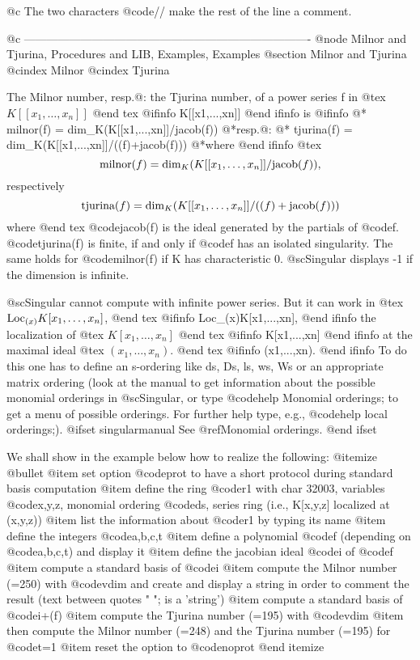 @c The two characters @code{//} make the rest of the line a comment.

@c ----------------------------------------------------------------------------
@node Milnor and Tjurina, Procedures and LIB, Examples, Examples
@section Milnor and Tjurina
@cindex Milnor
@cindex Tjurina

The Milnor number, resp.@: the Tjurina number, of a power
series f in
@tex
$K[[x_1,\ldots,x_n]]$
@end tex
@ifinfo
K[[x1,...,xn]]
@end ifinfo
is
@ifinfo
@*      milnor(f) = dim_K(K[[x1,...,xn]]/jacob(f))
@*resp.@:
@*      tjurina(f) = dim_K(K[[x1,...,xn]]/((f)+jacob(f)))
@*where
@end ifinfo
@tex
$$
\hbox{milnor}(f) = \hbox{dim}_K(K[[x_1,\ldots,x_n]]/\hbox{jacob}(f)),
$$
respectively
$$
\hbox{tjurina}(f) = \hbox{dim}_K(K[[x_1,\ldots,x_n]]/((f)+\hbox{jacob}(f)))
$$
where
@end tex
@code{jacob(f)} is the ideal generated by the partials
of @code{f}. @code{tjurina(f)} is finite, if and only if @code{f} has an
isolated singularity. The same holds for @code{milnor(f)} if
K has characteristic 0.
@sc{Singular} displays -1 if the dimension is infinite.

@sc{Singular} cannot compute with infinite power series. But it can
work in
@tex
$\hbox{Loc}_{(x)}K[x_1,\ldots,x_n]$,
@end tex
@ifinfo
Loc_(x)K[x1,...,xn],
@end ifinfo
the localization of
@tex
$K[x_1,\ldots,x_n]$
@end tex
@ifinfo
K[x1,...,xn]
@end ifinfo
at the maximal ideal
@tex
$(x_1,\ldots,x_n)$.
@end tex
@ifinfo
(x1,...,xn).
@end ifinfo
To do this one has to define an
s-ordering like ds, Ds, ls, ws, Ws or an appropriate matrix
ordering (look at the manual to get information about the possible
monomial orderings in @sc{Singular}, or type @code{help Monomial orderings;}
to get a menu of possible orderings. For further help type, e.g.,
@code{help local orderings;}).
@ifset singularmanual
See @ref{Monomial orderings}.
@end ifset

We shall show in the example below how to realize the following:
@itemize @bullet
@item
set option @code{prot} to have a short protocol during standard basis
computation
@item
define the ring @code{r1} with char 32003, variables @code{x,y,z}, monomial
  ordering @code{ds}, series ring (i.e., K[x,y,z] localized at (x,y,z))
@item
list the information about @code{r1} by typing its name
@item
define the integers @code{a,b,c,t}
@item
define a polynomial @code{f} (depending on @code{a,b,c,t}) and display it
@item
define the jacobian ideal @code{i} of @code{f}
@item
compute a standard basis of @code{i}
@item
compute the Milnor number (=250) with @code{vdim} and create and display
  a string in order to comment the result
  (text between quotes "  "; is a 'string')
@item
compute a standard basis of @code{i+(f)}
@item
compute the Tjurina number (=195) with @code{vdim}
@item
then compute the Milnor number (=248) and the Tjurina number
(=195) for @code{t}=1
@item
reset the option to @code{noprot}
@end itemize

